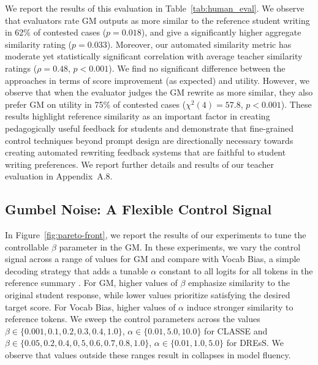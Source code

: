 \documentclass[letterpaper]{article} %
\newcommand{\ml}[1]{\textcolor{orange}{\bf [lan: #1]}}
\begin{document}
We report the results of this evaluation in Table~\ref{tab:human_eval}. We observe that evaluators rate GM outputs as more similar to the reference student writing in 62\% of contested cases ($p=0.018$), and give a significantly higher aggregate similarity rating ($p=0.033$). Moreover, our automated similarity metric has moderate yet statistically significant correlation with average teacher similarity ratings ($\rho=0.48$, $p<0.001$). We find no significant difference between the approaches in terms of score improvement (as expected) and utility. However, we observe that when the evaluator judges the GM rewrite as more similar, they also prefer GM on utility in 75\% of contested cases ($\chi^2(4)=57.8$, $p<0.001$). 
These results highlight reference similarity as an important factor in creating pedagogically useful feedback for students and demonstrate that fine-grained control techniques beyond prompt design are directionally necessary towards creating automated rewriting feedback systems that are faithful to student writing preferences. We report further details and results of our teacher evaluation in Appendix~A.8.


\subsection{Gumbel Noise: A Flexible Control Signal} \label{sec:tuning}

In Figure~\ref{fig:pareto-front}, we report the results of our experiments to tune the controllable $\beta$ parameter in the GM. In these experiments, we vary the control signal across a range of values for GM and compare with Vocab Bias, a simple decoding strategy that adds a tunable $\alpha$ constant to all logits for all tokens in the reference summary \cite{yang_fudge_2021}. For GM, higher values of $\beta$ emphasize similarity to the original student response, while lower values prioritize satisfying the desired target score. For Vocab Bias, higher values of $\alpha$ induce stronger similarity to reference tokens. We sweep the control parameters across the values $\beta \in \{0.001, 0.1, 0.2, 0.3, 0.4, 1.0\}$, $\alpha \in \{0.01, 5.0, 10.0\}$ for CLASSE and $\beta \in \{0.05, 0.2, 0.4, 0,5, 0.6, 0.7, 0.8, 1.0\}$, $\alpha \in \{0.01, 1.0, 5.0\}$ for DREsS. We observe that values outside these ranges result in collapses in model fluency. %
\end{document}
